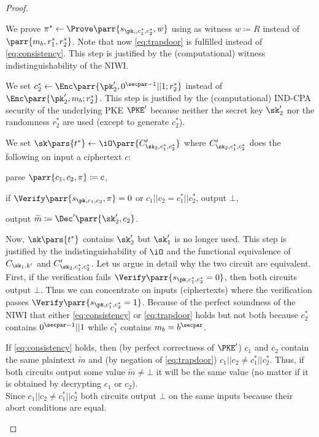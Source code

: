 \begin{proof}
\begin{hybrids}
        \item We prove \(\pi^* \gets \Prove\parr{s_{\pk,,c^*_1,c^*_2},w}\) using as witness \(w \coloneqq R\) instead of \(\parr{m_b,r^*_1,r^*_2}\).
        Note that now \cref{eq:trapdoor} is fulfilled instead of \cref{eq:consistency}.
        This step is justified by the (computational) witness indistinguishability of the NIWI.

        \item We set \(c^*_2 \gets \Enc\parr{\pk'_2,0^{\secpar-1}||1;r^*_2}\) instead of \(\Enc\parr{\pk'_2,m_b;r^*_2}\).
        This step is justified by the (computational) IND-CPA security of the underlying PKE \(\PKE'\) because neither the secret key \(\sk'_2\) nor the randomness \(r^*_2\) are used (except to generate \(c^*_2\)).

        \item We set \(\sk\pars{t^*} \gets \iO\parr{C'_{\sk_2,c^*_1,c^*_2}}\) where \(C'_{\sk_2,c^*_1,c^*_2}\) does the following on input a ciphertext \(c\):
        \begin{sitemize}
            \item parse \(\parr{c_1,c_2,\pi} \coloneqq c\),
            \item if \(\Verify\parr{s_{\pk,c_1,c_2},\pi} = 0\) or \(c_1||c_2 = c^*_1||c^*_2\), output \(\bot\),
            \item output \(\widetilde{m} \coloneqq \Dec'\parr{\sk'_2,c_2}\).
        \end{sitemize}
        Now, \(\sk\pars{t^*}\) contains \(\sk'_2\) but \(\sk'_1\) is no longer used.
        This step is justified by the indistinguishability of \(\iO\) and the functional equivalence of \(C_{\sk_1,k'}\) and \(C'_{\sk_2,c^*_1,c^*_2}\).
        Let us argue in detail why the two circuit are equivalent.
        First, if the verification fails \(\Verify\parr{s_{\pk,c^*_1,c^*_2} = 0}\),
        then both circuits output \(\bot\).
        Thus we can concentrate on inputs (ciphertexts) where the verification passes \(\Verify\parr{s_{\pk,c^*_1,c^*_2} = 1}\).
        Because of the perfect soundness of the NIWI that either \cref{eq:consistency} or \cref{eq:trapdoor} holds but not both because \(c^*_2\) contains \(0^{\secpar-1}||1\) while \(c^*_1\) contains \(m_b = b^\secpar\).
        \begin{sitemize}
            \item If \cref{eq:consistency} holds,
            then (by perfect correctness of \(\PKE'\)) \(c_1\) and \(c_2\) contain the same plaintext \(\widetilde{m}\) and (by negation of \cref{eq:trapdoor}) \(c_1||c_2 \neq c^*_1||c^*_2\).
            Thus, if both circuits output some value \(\widetilde{m} \neq \bot\) it will be the same value (no matter if it is obtained by decrypting \(c_1\) or \(c_2\)).
            \\
            Since \(c_1||c_2 \neq c^*_1||c^*_2\) both circuits output \(\bot\) on the same inputs because their abort conditions are equal.


\end{sitemize}
\end{hybrids}
\end{proof}
